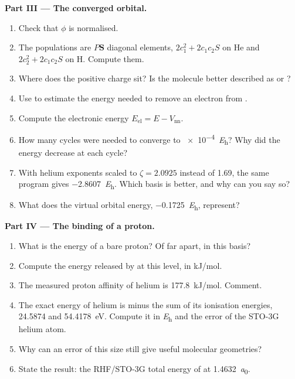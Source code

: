 \begin{problem}
\medskip\noindent\textbf{Part III --- The converged orbital.}
\begin{enumerate}[resume]
  \item Check that $\phi$ is normalised.
  \item The populations are $P\mathbf S$ diagonal elements, $2c_1^2 + 2c_1c_2S$
        on He and $2c_2^2 + 2c_1c_2S$ on H. Compute them.
  \item Where does the positive charge sit? Is the molecule better described
        as  or ?
  \item Use  to estimate the energy needed to remove an
        electron from .
  \item Compute the electronic energy $E_{\mathrm{el}} = E - V_{\mathrm{nn}}$.
  \item How many cycles were needed to converge to \qty{e-4}{\hartree}? Why did
        the energy decrease at each cycle?
  \item With helium exponents scaled to $\zeta = 2.0925$ instead of 1.69, the
        same program gives \qty{-2.8607}{\hartree}. Which basis is better, and
        why can you say so?
  \item What does the virtual orbital energy, \qty{-0.1725}{\hartree}, represent?
\end{enumerate}

\medskip\noindent\textbf{Part IV --- The binding of a proton.}
\begin{enumerate}[resume]
  \item What is the energy of a bare proton? Of  far apart, in this
        basis?
  \item Compute the energy released by  at this level, in
        \unit{kJ/mol}.
  \item The measured proton affinity of helium is \qty{177.8}{kJ/mol}.
        Comment.
  \item The exact energy of helium is minus the sum of its ionisation
        energies, 24.5874 and \qty{54.4178}{eV}. Compute it in \unit{\hartree} and
        the error of the STO-3G helium atom.
  \item Why can an error of this size still give useful molecular
        geometries?
  \item State the result: the RHF/STO-3G total energy of  at
        \qty{1.4632}{\bohr}.
\end{enumerate}
\end{problem}

